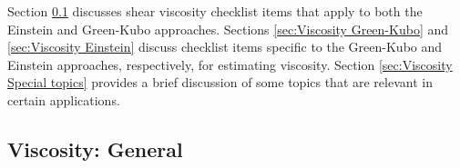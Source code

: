 \documentclass[9pt,bestpractices]{livecoms}
\begin{document}


Section \ref{sec:Viscosity General} discusses shear viscosity checklist items that apply to both the Einstein and Green-Kubo approaches. Sections \ref{sec:Viscosity Green-Kubo} and \ref{sec:Viscosity Einstein} discuss checklist items specific to the Green-Kubo and Einstein approaches, respectively, for estimating viscosity. Section \ref{sec:Viscosity Special topics} provides a brief discussion of some topics that are relevant in certain applications.


\subsection{Viscosity: General} \label{sec:Viscosity General}
\end{document}
